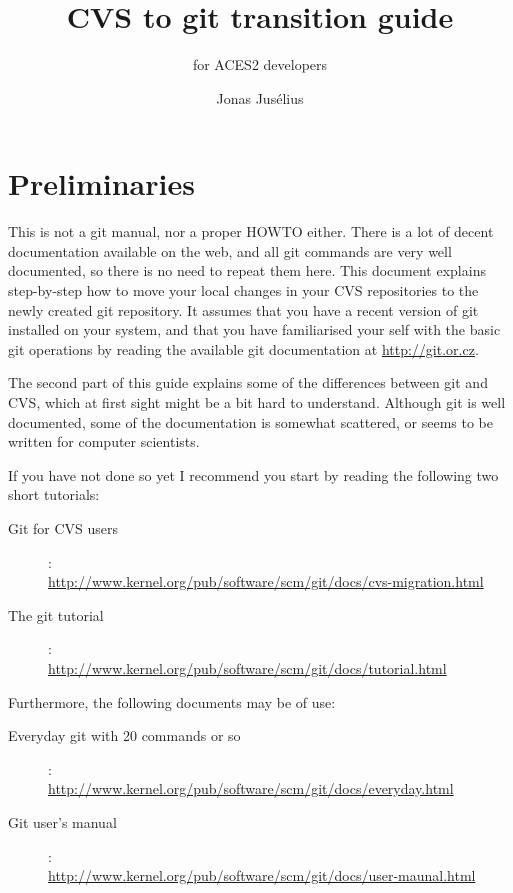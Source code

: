 \documentclass[a4paper,10pt]{article}
\begin{document}
\pagestyle{fancy}
\fancyfoot{}
\fancyhead{}
\renewcommand{\sectionmark}[1]{\markboth{\sf\thesection.\ #1}{}}
\renewcommand{\subsectionmark}[1]{}
\fancyhead[R]{{\rmfamily\thepage}}

\title{CVS to git transition guide}

\subtitle{for ACES2 developers}
\author{{\sf Jonas Jus\'elius}}
\address{
{\sf University of Tromsø}\\
{\sf Department of Chemistry}\\
{\sf N-9037 University of Tromsø, Norway}
}

\maketitle

\section{Preliminaries}
This is not a git manual, nor a proper HOWTO either. There is a lot of decent
documentation available on the web, and all git commands are very well
documented, so there is no need to repeat them here. 
This document explains step-by-step how to move your local changes
in your CVS repositories to the newly created git repository. It assumes that
you have a recent version of git installed on your system, and that you have
familiarised your self with the basic git operations by reading the available
git documentation at \url{http://git.or.cz}. 

The second part of this guide explains some of the differences between git and
CVS, which at first sight might be a bit hard to understand. Although git is
well documented, some of the documentation is somewhat scattered, or seems to
be written for computer scientists.

If you have not done so yet I
recommend you start by reading the following two short tutorials:
\begin{description}
\item[Git for CVS users]:\\
\url{http://www.kernel.org/pub/software/scm/git/docs/cvs-migration.html}
\item[The git tutorial]:\\
\url{http://www.kernel.org/pub/software/scm/git/docs/tutorial.html}
\end{description}
Furthermore, the following documents may be of use:
\begin{description}
\item[Everyday git with 20 commands or so]:\\
\url{http://www.kernel.org/pub/software/scm/git/docs/everyday.html}
\item[Git user's manual]:\\
\url{http://www.kernel.org/pub/software/scm/git/docs/user-maunal.html}
\end{description}
\end{document}
